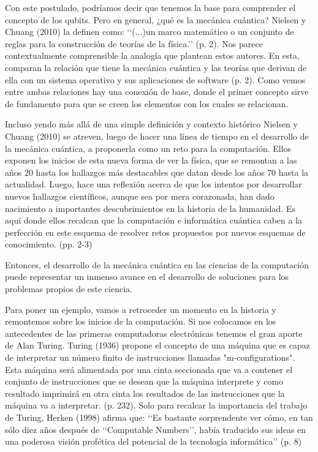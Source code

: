 \documentclass[11pt,a4paper]{article}
\begin{document}
Con este postulado, podríamos decir que tenemos la base para comprender el concepto de los qubits. Pero en general, ¿qué es la mecánica cuántica? Nielsen y Chuang (2010) la definen como: ‘‘(...)un marco matemático o un conjunto de reglas para la construcción de teorías de la física.’’ (p. 2). Nos parece contextualmente comprensible la analogía que plantean estos autores. En esta, comparan la relación que tiene la mecánica cuántica y las teorías que derivan de ella con un sistema operativo y sus aplicaciones de software (p. 2). Como vemos entre ambas relaciones hay una conexión de base, donde el primer concepto sirve de fundamento para que se creen los elementos con los cuales se relacionan.

Incluso yendo más allá de una simple definición y contexto histórico Nielsen y Chuang (2010) se atreven, luego de hacer una línea de tiempo en el desarrollo de la mecánica cuántica, a proponerla como un reto para la computación. Ellos exponen los inicios de esta nueva forma de ver la física, que se remontan a las años 20 hasta los hallazgos más destacables que datan desde los años 70 hasta la actualidad. Luego, hace una reflexión acerca de que los intentos por desarrollar nuevos hallazgos científicos, aunque sea por mera corazonada, han dado nacimiento a importantes descubrimientos en la historia de la humanidad. Es aquí donde ellos recalcan que la computación e informática cuántica caben a la perfección en este esquema de resolver retos propuestos por nuevos esquemas de conocimiento. (pp. 2-3)

Entonces, el desarrollo de la mecánica cuántica en las ciencias de la computación puede representar un inmenso avance en el desarrollo de soluciones para los problemas propios de este ciencia. 

Para poner un ejemplo, vamos a retroceder un momento en la historia y remontemos sobre los inicios de la computación. Si nos colocamos en los antecedentes de las primeras computadoras electrónicas tenemos el gran aporte de Alan Turing. Turing (1936) propone el concepto de una máquina que es capaz de interpretar un número finito de instrucciones llamadas "m-configurations". Esta máquina será alimentada por una cinta seccionada que va a contener el conjunto de instrucciones que se desean que la máquina interprete y como resultado imprimirá en otra cinta los resultados de las instrucciones que la máquina va a interpretar. (p. 232). Solo para recalcar la importancia del trabajo de Turing, Herken (1998) afirma que: ‘‘Es bastante sorprendente ver cómo, en tan sólo diez años después de ‘‘Computable Numbers’’, había traducido sus ideas en una poderosa visión profética del potencial de la tecnología informática’’ (p. 8) 
\end{document}
